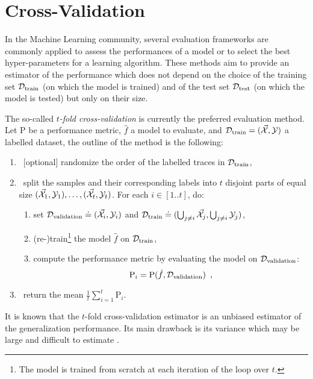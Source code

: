 \chapter{Cross-Validation} 

\label{app:cross-validation} 

In the Machine Learning community, several evaluation frameworks are commonly
applied to assess the performances of a model or to select the best hyper-parameters
for a learning algorithm. These methods aim to provide an
estimator of the performance which does not
depend on the choice of the training set $\mathcal{D}_{\text{train}}$ (on which the model is trained) and of the
test set $\mathcal{D}_{\text{test}}$ (on which the model is tested) but only on their size.

The so-called \emph{$t$-fold
cross-validation} \cite{friedman2001elements} is currently the preferred evaluation method. Let P be a
performance metric, $\hat{f}$ a model to evaluate, and $\mathcal{D}_{\text{train}}=(\vec{\mathcal{X}}, {\mathcal{Y}})$ a labelled dataset, the outline of the method is the
following: 
\begin{enumerate}
\item ~[optional] randomize the order of the labelled traces in $\mathcal{D}_{\text{train}}$, 
\item ~split the samples and their corresponding labels into $t$ disjoint parts
of equal size $(\vec{\mathcal{X}}_1,{\mathcal{Y}}_1),\ldots,(\vec{\mathcal{X}}_t,{\mathcal{Y}}_t)$.
For each $i\in [1..t]$, do:
\begin{enumerate}
\item set $\mathcal{D}_{\text{validation}} \doteq (\vec{\mathcal{X}}_i, {\mathcal{Y}}_i)$ and
$\mathcal{D}_{\text{train}} \doteq (\bigcup_{j\neq i} \vec{\mathcal{X}}_j, \bigcup_{j\neq
i} {\mathcal{Y}}_j)$,
\item (re-)train\footnote{The model is trained from scratch at each iteration of the loop over $t$.} the model $\hat{f}$ on $\mathcal{D}_{\text{train}}$, 
\item compute the performance metric by evaluating the model on $\mathcal{D}_{\text{validation}}$:
\begin{equation}\label{equ:perMetric}
\text{P}_i = \text{P}(\hat{f}, \mathcal{D}_{\text{validation}}) \enspace ,
\end{equation}
\end{enumerate}
\item ~return the mean $\frac{1}{t}\sum_{i=1}^t \text{P}_i$.
\end{enumerate}

It is known that the $t$-fold cross-validation estimator is an unbiased
estimator of the generalization performance. Its main drawback is its variance
which may be large and difficult to estimate
\cite{breiman1996heuristics,bengio2005bias}. 